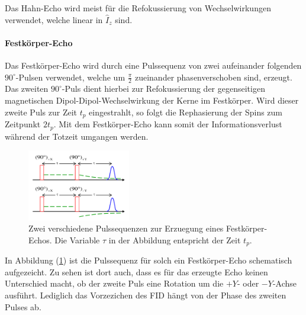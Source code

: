 Das Hahn-Echo wird meist f\"{u}r die Refokussierung von Wechselwirkungen verwendet, welche linear in $\widehat{I}_z$ sind.

\paragraph{Festk\"{o}rper-Echo}
Das Festk\"{o}rper-Echo wird durch eine Pulssequenz von zwei aufeinan{\-}der folgenden $90^{\circ}$-Pulsen verwendet, welche um $\frac{\pi}{2}$ zueinander phasenverschoben sind, erzeugt.
Das zweiten $90^{\circ}$-Puls dient hierbei zur Refokussierung der gegenseitigen magne{\-}tisch{\-}en Dipol-Dipol-Wechselwirkung der Kerne im Festkörper.
Wird dieser zweite Puls zur Zeit $t_p$ eingestrahlt, so folgt die Rephasierung der Spins zum Zeitpunkt $2 t_p$.
Mit dem Festk\"{o}rper-Echo kann somit der Informationsverlust w\"{a}hrend der Totzeit umgangen werden.
\begin{figure}
\centering
	\includegraphics[width=0.4\textwidth]{Plots/festkoerperecho2.png}
	\caption{Zwei verschiedene Pulssequenzen zur Erzuegung eines Festk\"{o}rper-Echos. Die Variable $\tau$ in der Abbildung entspricht der Zeit $t_p$.}
	\label{FK_echo.}
\end{figure}
In Abbildung (\ref{FK_echo.}) ist die Pulssequenz f\"{u}r solch ein Festk\"{o}rper-Echo schematisch aufgezeicht.
Zu sehen ist dort auch, dass es f\"{u}r das erzeugte Echo keinen Unterschied macht, ob der zweite Puls eine Rotation um die $+Y$- oder $-Y$-Achse ausf\"{u}hrt.
Lediglich das Vorzezichen des FID h\"{a}ngt von der Phase des zweiten Pulses ab.

